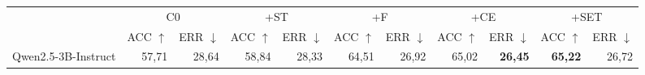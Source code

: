 \begin{tabular}{l*{5}{rr}}\toprule
 & \multicolumn{2}{c}{C0} & \multicolumn{2}{c}{+ST} & \multicolumn{2}{c}{+F} & \multicolumn{2}{c}{+CE} & \multicolumn{2}{c}{+SET}\\
 & ACC $\uparrow$ & ERR $\downarrow$ & ACC $\uparrow$ & ERR $\downarrow$ & ACC $\uparrow$ & ERR $\downarrow$ & ACC $\uparrow$ & ERR $\downarrow$ & ACC $\uparrow$ & ERR $\downarrow$\\\midrule
Qwen2.5-3B-Instruct & 57,71 & 28,64 & 58,84 & 28,33 & 64,51 & 26,92 & 65,02 & \textbf{26,45} & \textbf{65,22} & 26,72\\
\bottomrule\end{tabular}
